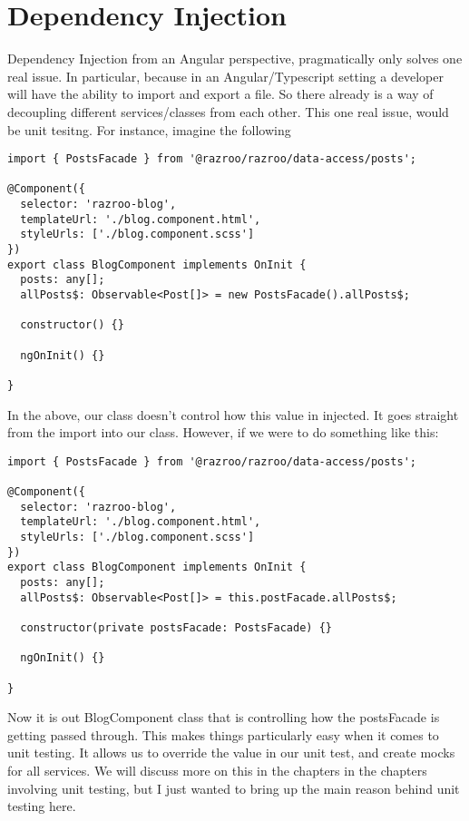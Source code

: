 \chapter{ Dependency Injection }

Dependency Injection from an Angular perspective, pragmatically only solves 
one real issue. In particular, because in an Angular/Typescript setting 
a developer will have the ability to import and export a file. So there 
already is a way of decoupling different services/classes from each other. 
This one real issue, would be unit tesitng. For instance, imagine the following 
\begin{lstlisting}[caption=passing in without dependency injection]
import { PostsFacade } from '@razroo/razroo/data-access/posts';  

@Component({
  selector: 'razroo-blog',
  templateUrl: './blog.component.html',
  styleUrls: ['./blog.component.scss']
})
export class BlogComponent implements OnInit {
  posts: any[];
  allPosts$: Observable<Post[]> = new PostsFacade().allPosts$;

  constructor() {}

  ngOnInit() {}

}
\end{lstlisting}
In the above, our class doesn't control how this value in injected. It 
goes straight from the import into our class. However, if we were to do 
something like this: 

\begin{lstlisting}[caption=passing in with dependency injection]
import { PostsFacade } from '@razroo/razroo/data-access/posts';  

@Component({
  selector: 'razroo-blog',
  templateUrl: './blog.component.html',
  styleUrls: ['./blog.component.scss']
})
export class BlogComponent implements OnInit {
  posts: any[];
  allPosts$: Observable<Post[]> = this.postFacade.allPosts$;

  constructor(private postsFacade: PostsFacade) {}

  ngOnInit() {}

}  
\end{lstlisting}

Now it is out BlogComponent class that is controlling how the postsFacade 
is getting passed through. This makes things particularly easy when it comes
to unit testing. It allows us to override the value in our unit test, and create 
mocks for all services. We will discuss more on this in the chapters in the chapters 
involving unit testing, but I just wanted to bring up the main reason behind unit 
testing here. 

